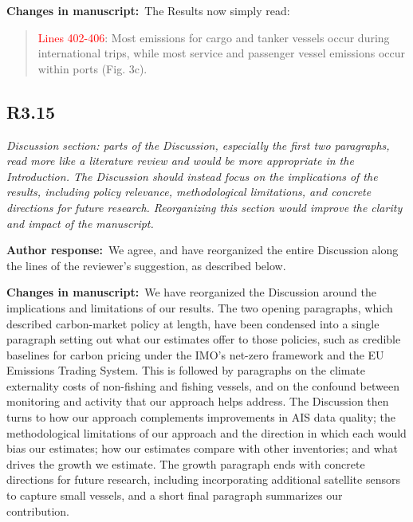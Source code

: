 \documentclass[11pt]{article}
\newcommand{\point}[1]{\subsection*{\normalfont\bfseries #1}}
\newcommand{\response}{\par\medskip\noindent%
  \textbf{\textcolor{respblue}{Author response:}}\ }
\newcommand{\changes}{\par\medskip\noindent%
  \textbf{\textcolor{changegreen}{Changes in manuscript:}}\ }
\begin{document}
\changes The Results now simply read:

\begin{quote}
 \textcolor{red}{Lines 402-406}: Most emissions for cargo and tanker vessels occur during international trips, while most service and passenger vessel emissions occur within ports (Fig. 3c).
\end{quote}

\point{R3.15}

\begin{refquote}\itshape
Discussion section: parts of the Discussion, especially the first two paragraphs,
read more like a literature review and would be more appropriate in the
Introduction. The Discussion should instead focus on the implications of the
results, including policy relevance, methodological limitations, and concrete
directions for future research. Reorganizing this section would improve the
clarity and impact of the manuscript.
\end{refquote}

\response We agree, and have reorganized the entire Discussion along the lines of the reviewer's suggestion, as described below.  

\changes We have reorganized the Discussion around the implications and limitations of our results. The two opening paragraphs, which described carbon-market policy at length, have been condensed into a single paragraph setting out what our estimates offer to those policies, such as credible baselines for carbon pricing under the IMO's net-zero framework and the EU Emissions Trading System. This is followed by paragraphs on the climate externality costs of non-fishing and fishing vessels, and on the confound between monitoring and activity that our approach helps address. The Discussion then turns to how our approach complements improvements in AIS data quality; the methodological limitations of our approach and the direction in which each would bias our estimates; how our estimates compare with other inventories; and what drives the growth we estimate. The growth paragraph ends with concrete directions for future research, including incorporating additional satellite sensors to capture small vessels, and a short final paragraph summarizes our contribution.
\end{document}
